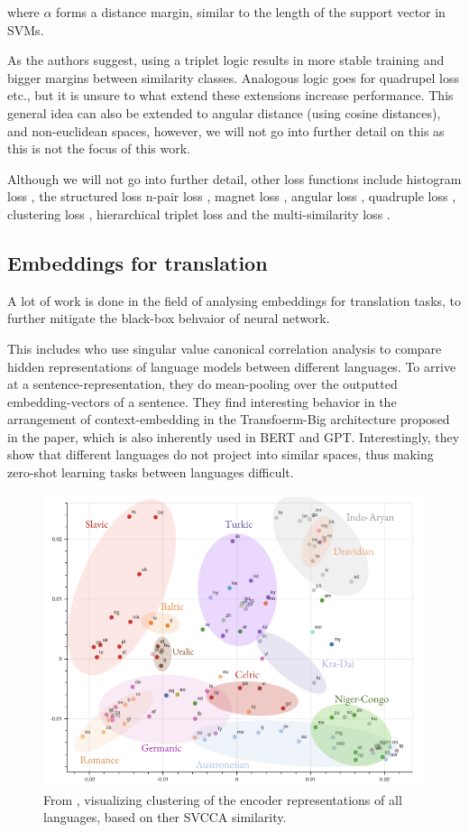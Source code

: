 \documentclass[a4paper,12pt,twoside,openright]{report}
\begin{document}
where $\alpha$ forms a distance margin, similar to the length of the support vector in SVMs.

As the authors suggest, using a triplet logic results in more stable training and bigger margins between similarity classes.
Analogous logic goes for quadrupel loss etc., but it is unsure to what extend these extensions increase performance.
This general idea can also be extended to angular distance (using cosine distances), and non-euclidean spaces, however, we will not go into further detail on this as this is not the focus of this work.

Although we will not go into further detail, other loss functions include histogram loss \cite{ustinova16}, the structured loss \cite{song16} n-pair loss \cite{sohn16}, magnet loss \cite{rippel16}, angular loss \cite{wang17}, quadruple loss \cite{ni17}, clustering loss \cite{song17}, hierarchical triplet loss \cite{ge18} and the multi-similarity loss \cite{wang19c}.

\subsection{Embeddings for translation}

A lot of work is done in the field of analysing embeddings for translation tasks, to further mitigate the black-box behvaior of neural network.

This includes \cite{kudugunta18} who use singular value canonical correlation analysis to compare hidden representations of language models between different languages.
To arrive at a sentence-representation, they do mean-pooling over the outputted embedding-vectors of a sentence. 
They find interesting behavior in the arrangement of context-embedding in the Transfoerm-Big architecture proposed in the \cite{vaswani17} paper, which is also inherently used in BERT and GPT.
Interestingly, they show that different languages do not project into similar spaces, thus making zero-shot learning tasks between languages difficult.


\begin{figure}[h]
	\center
  \includegraphics[width=0.6\linewidth]{./assets/relatedwork/embeddings_by_language.png}
  \caption{From \cite{kudugunta18}, visualizing clustering of the encoder representations of all languages, based on ther SVCCA similarity.}
  \label{fig:embeddings_by_language}
\end{figure}
\end{document}
